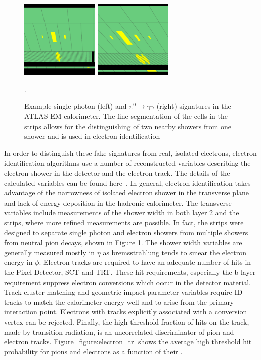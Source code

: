 \begin{figure}[!t]
\centering 
\includegraphics[width=0.33\textwidth]{figs/electron/photon.png}
\includegraphics[width=0.33\textwidth]{figs/electron/pi0.png}
\caption {Example single photon (left) and $\pi^0\rightarrow\gamma\gamma$ (right) signatures in the ATLAS EM calorimeter. The fine segmentation of the cells in the strips allows for the distinguishing of two nearby showers from one shower
and is used in electron identification}.
\label{figure:electron_pi0}
\end{figure}

In order to distinguish these fake signatures from real, isolated electrons, electron identification algorithms use a number of reconstructed variables describing the electron shower in the detector and the electron track. The details of the calculated variables can be found here~\cite{ATL-PHYS-PUB-2011-006}. In general, electron identification takes advantage of the narrowness of isolated electron shower in the transverse plane and lack of energy deposition in the hadronic calorimeter. The transverse variables include measurements of the shower width in both layer 2 and the strips, where more refined measurements are possible. In fact, the strips were designed to separate single photon and electron showers from multiple showers from neutral pion decays, shown in Figure \ref{figure:electron_pi0}. The shower width variables are generally measured mostly in $\eta$ as bremsstrahlung tends to smear the electron energy in $\phi$. Electron tracks are required to have an adequate number of hits in the Pixel Detector, SCT and TRT. These hit requirements, especially the b-layer requirement suppress electron conversions which occur in the detector material. Track-cluster matching and geometric impact parameter variables require ID tracks to match the calorimeter energy well and to arise from the primary interaction point. Electrons with tracks explicitly associated with a conversion vertex can be rejected. Finally, the high threshold fraction of hits on the track, made by transition radiation, is an uncorrelated discriminator of pion and electron tracks. Figure~\ref{figure:electron_tr} shows the average high threshold hit probability for pions and electrons as a function of their \pt. 

